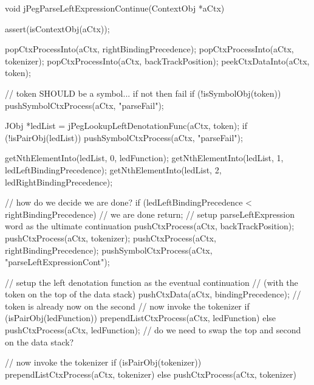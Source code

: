 void jPegParseLeftExpressionContinue(ContextObj *aCtx) {
  assert(isContextObj(aCtx));
  
  popCtxProcessInto(aCtx, rightBindingPrecedence);
  popCtxProcessInto(aCtx, tokenizer);
  popCtxProcessInto(aCtx, backTrackPosition);
  peekCtxDataInto(aCtx, token);
  
  // token SHOULD be a symbol... if not then fail
  if (!isSymbolObj(token)) pushSymbolCtxProcess(aCtx, "parseFail");
  
  JObj *ledList = jPegLookupLeftDenotationFunc(aCtx, token);
  if (!isPairObj(ledList)) pushSymbolCtxProcess(aCtx, "parseFail");
  
  getNthElementInto(ledList, 0, ledFunction);
  getNthElementInto(ledList, 1, ledLeftBindingPrecedence);
  getNthElementInto(ledList, 2, ledRightBindingPrecedence);
  
  // how do we decide we are done?
  if (ledLeftBindingPrecedence < rightBindingPrecedence) {
    // we are done
    return;
  }
    // setup parseLeftExpression word as the ultimate continuation
  pushCtxProcess(aCtx, backTrackPosition);
  pushCtxProcess(aCtx, tokenizer);
  pushCtxProcess(aCtx, rightBindingPrecedence);
  pushSymbolCtxProcess(aCtx, "parseLeftExpressionCont");
  
  // setup the left denotation function as the eventual continuation
  // (with the token on the top of the data stack)
  pushCtxData(aCtx, bindingPrecedence);
  // token is already now on the second
  // now invoke the tokenizer
  if (isPairObj(ledFunction)) prependListCtxProcess(aCtx, ledFunction)
  else pushCtxProcess(aCtx, ledFunction);
  // do we need to swap the top and second on the data stack?
  
  // now invoke the tokenizer
  if (isPairObj(tokenizer)) prependListCtxProcess(aCtx, tokenizer)
  else pushCtxProcess(aCtx, tokenizer)
}
\stopCCode

\startTestCase[should]

\startCTest

\stopCTest
\stopTestCase
\stopTestSuite
